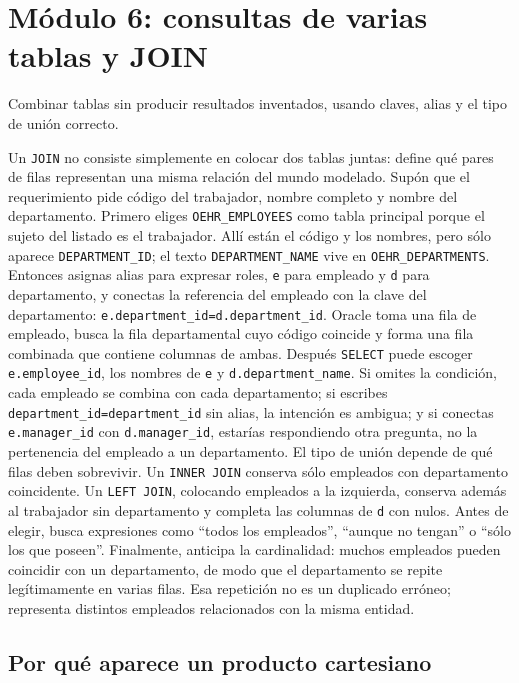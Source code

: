 \documentclass[11pt,a4paper]{article}
\newcommand{\campo}[1]{\texttt{#1}}
\newcommand{\tabla}[1]{\texttt{#1}}
\begin{document}
\section{Módulo 6: consultas de varias tablas y JOIN}

\begin{objetivo}
Combinar tablas sin producir resultados inventados, usando claves, alias y el tipo de unión correcto.
\end{objetivo}

Un \campo{JOIN} no consiste simplemente en colocar dos tablas juntas: define qué pares de filas
representan una misma relación del mundo modelado. Supón que el requerimiento pide código del
trabajador, nombre completo y nombre del departamento. Primero eliges
\tabla{OEHR_EMPLOYEES} como tabla principal porque el sujeto del listado es el trabajador. Allí están
el código y los nombres, pero sólo aparece \campo{DEPARTMENT_ID}; el texto
\campo{DEPARTMENT_NAME} vive en \tabla{OEHR_DEPARTMENTS}. Entonces asignas alias para expresar roles,
\campo{e} para empleado y \campo{d} para departamento, y conectas la referencia del empleado con la
clave del departamento: \campo{e.department_id=d.department_id}. Oracle toma una fila de empleado,
busca la fila departamental cuyo código coincide y forma una fila combinada que contiene columnas de
ambas. Después \campo{SELECT} puede escoger \campo{e.employee_id}, los nombres de \campo{e} y
\campo{d.department_name}. Si omites la condición, cada empleado se combina con cada departamento;
si escribes \campo{department_id=department_id} sin alias, la intención es ambigua; y si conectas
\campo{e.manager_id} con \campo{d.manager_id}, estarías respondiendo otra pregunta, no la pertenencia
del empleado a un departamento. El tipo de unión depende de qué filas deben sobrevivir. Un
\campo{INNER JOIN} conserva sólo empleados con departamento coincidente. Un
\campo{LEFT JOIN}, colocando empleados a la izquierda, conserva además al trabajador sin
departamento y completa las columnas de \campo{d} con nulos. Antes de elegir, busca expresiones como
``todos los empleados'', ``aunque no tengan'' o ``sólo los que poseen''. Finalmente, anticipa la
cardinalidad: muchos empleados pueden coincidir con un departamento, de modo que el departamento se
repite legítimamente en varias filas. Esa repetición no es un duplicado erróneo; representa distintos
empleados relacionados con la misma entidad.

\subsection{Por qué aparece un producto cartesiano}
\end{document}

